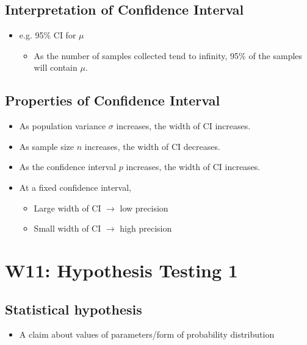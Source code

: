 \documentclass[a4paper]{article}
\begin{document}
\subsection{Interpretation of Confidence Interval}
\begin{itemize}
    \item e.g. 95\% CI for $\mu$
    \begin{itemize}[label=$\circ$]
        \item As the number of samples collected tend to infinity, 95\% of the samples will contain $\mu$.
    \end{itemize}
\end{itemize}
\newpage
\subsection{Properties of Confidence Interval}
\begin{itemize}
    \item As population variance $\sigma$ increases, the width of CI increases.
    \item As sample size $n$ increases, the width of CI decreases.
    \item As the confidence interval $p$ increases, the width of CI increases.
    \item At a fixed confidence interval,
    \begin{itemize}[label=$\circ$]
        \item Large width of CI $\rightarrow{}$ low precision
        \item Small width of CI $\rightarrow{}$ high precision
    \end{itemize}
\end{itemize}
\newpage
\section{W11: Hypothesis Testing 1}
\subsection{Statistical hypothesis}
\begin{itemize}
    \item A claim about values of parameters/form of probability distribution
\end{itemize}
\end{document}
